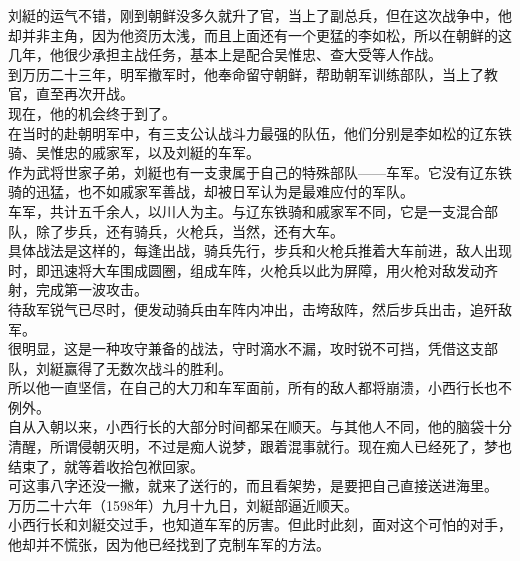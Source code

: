 \begin{multicols}{\theparacolNo}
刘綎的运气不错，刚到朝鲜没多久就升了官，当上了副总兵，但在这次战争中，他却并非主角，因为他资历太浅，而且上面还有一个更猛的李如松，所以在朝鲜的这几年，他很少承担主战任务，基本上是配合吴惟忠、查大受等人作战。\\

到万历二十三年，明军撤军时，他奉命留守朝鲜，帮助朝军训练部队，当上了教官，直至再次开战。\\

现在，他的机会终于到了。\\

在当时的赴朝明军中，有三支公认战斗力最强的队伍，他们分别是李如松的辽东铁骑、吴惟忠的戚家军，以及刘綎的车军。\\

作为武将世家子弟，刘綎也有一支隶属于自己的特殊部队——车军。它没有辽东铁骑的迅猛，也不如戚家军善战，却被日军认为是最难应付的军队。\\

车军，共计五千余人，以川人为主。与辽东铁骑和戚家军不同，它是一支混合部队，除了步兵，还有骑兵，火枪兵，当然，还有大车。\\

具体战法是这样的，每逢出战，骑兵先行，步兵和火枪兵推着大车前进，敌人出现时，即迅速将大车围成圆圈，组成车阵，火枪兵以此为屏障，用火枪对敌发动齐射，完成第一波攻击。\\

待敌军锐气已尽时，便发动骑兵由车阵内冲出，击垮敌阵，然后步兵出击，追歼敌军。\\

很明显，这是一种攻守兼备的战法，守时滴水不漏，攻时锐不可挡，凭借这支部队，刘綎赢得了无数次战斗的胜利。\\

所以他一直坚信，在自己的大刀和车军面前，所有的敌人都将崩溃，小西行长也不例外。\\

自从入朝以来，小西行长的大部分时间都呆在顺天。与其他人不同，他的脑袋十分清醒，所谓侵朝灭明，不过是痴人说梦，跟着混事就行。现在痴人已经死了，梦也结束了，就等着收拾包袱回家。\\

可这事八字还没一撇，就来了送行的，而且看架势，是要把自己直接送进海里。\\

万历二十六年（1598年）九月十九日，刘綎部逼近顺天。\\

小西行长和刘綎交过手，也知道车军的厉害。但此时此刻，面对这个可怕的对手，他却并不慌张，因为他已经找到了克制车军的方法。\\


\end{multicols}
